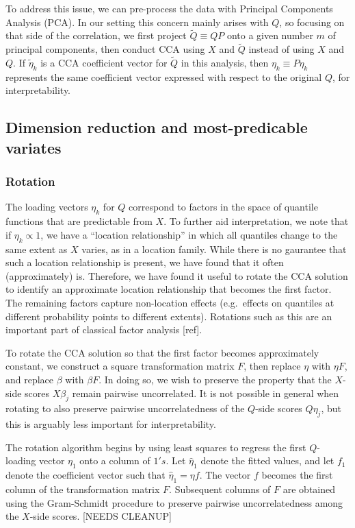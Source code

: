 To address this issue, we can pre-process the data with Principal
Components Analysis (PCA).  In our setting this concern mainly arises
with $Q$, so focusing on that side of the correlation, we first project
$\tilde{Q} \equiv QP$ onto a given number $m$ of principal components,
then conduct CCA using $X$ and $\tilde{Q}$ instead of using $X$ and $Q$.
If $\tilde{\eta}_k$ is a CCA coefficient vector for $\tilde{Q}$ in this
analysis, then $\eta_k \equiv P\eta_k$ represents the same coefficient
vector expressed with respect to the original $Q$, for interpretability.

\subsection{Dimension reduction and most-predicable variates}

\subsubsection{Rotation}

The loading vectors $\eta_k$ for $Q$ correspond to factors in the space
of quantile functions that are predictable from $X$.  To further aid
interpretation, we note that if $\eta_k \propto 1$, we have a ``location
relationship'' in which all quantiles change to the same extent as $X$
varies, as in a location family.  While there is no gaurantee that
such a location relationship is present, we have found that it often
(approximately) is.  Therefore, we have found it useful to rotate the
CCA solution to identify an approximate location relationship that
becomes the first factor.  The remaining factors capture non-location
effects (e.g.\ effects on quantiles at different probability points to
different extents).  Rotations such as this are an important part of
classical factor analysis [ref].

To rotate the CCA solution so that the first factor becomes approximately
constant, we construct a square transformation matrix $F$, then replace
$\eta$ with $\eta F$, and replace $\beta$ with $\beta F$.  In doing so, we
wish to preserve the property that the $X$-side scores $X\beta_j$ remain
pairwise uncorrelated.  It is not possible in general when rotating to
also preserve pairwise uncorrelatedness of the $Q$-side scores $Q\eta_j$,
but this is arguably less important for interpretability.

The rotation algorithm begins by using least squares to regress the first
$Q$-loading vector $\eta_1$ onto a column of $1's$.  Let $\hat{\eta}_1$
denote the fitted values, and let $f_1$ denote the coefficient vector
such that $\hat{\eta}_1 = \eta f$. The vector $f$ becomes the first
column of the transformation matrix $F$.  Subsequent columns of $F$
are obtained using the Gram-Schmidt procedure to preserve pairwise
uncorrelatedness among the $X$-side scores. [NEEDS CLEANUP]

